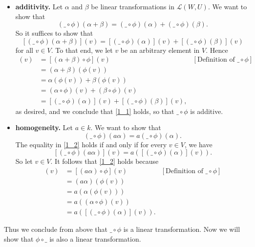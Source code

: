 \documentclass[9pt]{article}
\begin{document}
\begin{enumerate}
      \begin{itemize}
         \item \textbf{additivity.} Let $\alpha$ and $\beta$ be linear
               transformations in $\mathcal{L}(W, U)$. We want to show that
               \begin{equation} \label{1_1}
                  (\_\circ\phi)(\alpha+\beta) = (\_\circ\phi)(\alpha) +
                  (\_\circ\phi)(\beta).
               \end{equation}
               So it suffices to show that
               $$[(\_\circ\phi)(\alpha+\beta)](v) = [(\_\circ\phi)(\alpha)](v) +
                 [(\_\circ\phi)(\beta)](v)$$
               for all $v \in V$. To that end, we let $v$ be an arbitrary
               element in $V$. Hence
               \begin{align*}
                  [(\_\circ\phi)(\alpha+\beta)](v) &=
                     [(\alpha+\beta)\circ\phi](v)
                        &[\text{Definition of }\_\circ\phi ] \\
                     &= (\alpha + \beta)(\phi(v)) \\
                     &= \alpha(\phi(v)) + \beta(\phi(v)) \\
                     &= (\alpha\circ\phi)(v) + (\beta\circ\phi)(v) \\
                     &= [(\_\circ\phi)(\alpha)](v) + [(\_\circ\phi)(\beta)](v),
               \end{align*}
               as desired, and we conclude that \eqref{1_1} holds, so that
               $\_\circ\phi$ is additive.
         \item \textbf{homogeneity.} Let $a \in k$. We want to show that
               \begin{equation} \label{1_2}
                  (\_\circ\phi)(a\alpha) = a(\_\circ\phi)(\alpha).
               \end{equation}
               The equality in \eqref{1_2} holds if and only if for every
               $v \in V$, we have
               $$[(\_\circ\phi)(a\alpha)](v) = a([(\_\circ\phi)(\alpha)](v)).$$
               So let $v \in V$. It follows that \eqref{1_2} holds because
               \begin{align*}
                  [(\_\circ\phi)(a\alpha)](v) &= [(a\alpha)\circ\phi](v)
                     &[\text{Definition of }\_\circ\phi ] \\
                     &= (a\alpha)(\phi(v)) \\
                     &= a(\alpha(\phi(v))) \\
                     &= a((\alpha\circ\phi)(v)) \\
                     &= a([(\_\circ\phi)(\alpha)](v)).
               \end{align*}
      \end{itemize}
      Thus we conclude from above that $\_\circ\phi$ is a linear transformation.
      Now we will show that $\phi\circ\_$ is also a linear transformation.


\end{enumerate}
\end{document}
